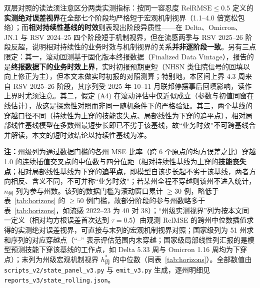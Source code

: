 \documentclass[11pt,a4paper]{article}
\theoremstyle{plain}
\theoremstyle{definition}
\begin{document}
双层对照的读法须注意区分两类实测指标：按同一容忍度 $\text{RelRMSE} \le 0.5$ 定义的\textbf{实测绝对误差视界}在全部七个阶段均严格短于宏观机制视界（1.1--4.0 倍宽松包络）；而\textbf{相对持续性基线的时效}则表现出阶段异质性——在 Delta、Omicron、JN.1 与 RSV 2024--25 四个阶段短于机制视界，但在流感两季与 RSV 2025--26 阶段反超，说明相对持续性的业务时效与机制视界的关系\textbf{并非逐阶段一致}。另有三点限定：其一，滚动回测基于固化版本终报数据（Finalized Data Vintage），报告的是\textbf{终报数据下的业务时效上界}，实时初报预期更短（NHSN 类住院信号的回填以向上修正为主），但本文未做实时初报的对照测算；特别地，本区间上界 4.3 周来自 RSV 2025--26 阶段，其序列受 2025 年 10--11 月联邦停摆事后回填影响，读作上界时尤须注意。其二，假定 (A4) 在滚动评估中仅近似成立（参数与初值同窗在线估计），故这是探索性对照而非同一随机条件下的严格验证。其三，两个基线的穿越口径不同（持续性为上穿的技能丧失点、局部线性为下穿的追平点），相对局部线性基线模型在多数州最短步长即已不劣于该基线，故“业务时效”不可跨基线合并解读，本文的短时效结论以持续性基线为准。

\begin{table}[htbp]
\centering
\footnotesize
\caption{宏观机制视界与伪实时滚动业务时效的州级双层对照}
\label{tab:rolling}
\resizebox{\textwidth}{!}{%
%
}
\vspace{2pt}
\begin{flushleft}
\scriptsize \textbf{注：}州级列为通过数据门槛的各州 MSE 比率（跨 6 个原点的均方误差之比）穿越 1.0 的连续插值交叉点的中位数与四分位距（相对持续性基线为上穿的\textbf{技能丧失点}；相对局部线性基线为下穿的\textbf{追平点}，即模型自该步长起不劣于该基线，两者方向相反、含义不同，不可并称“业务时效”；若某州全程不穿越则该州不进入统计，$n_{\text{州}}$ 列为参与州数。该列的数据门槛为滚动窗口累计 $\ge 30$ 例，略低于表~\ref{tab:horizons} 的 $\ge 50$ 例门槛，故部分阶段的参与州数略多于表~\ref{tab:horizons}，如流感 2022--23 为 40 对 38）；``州级实测视界''列为按本文同一定义（相对均方根误差首次达到 $\tau=0.5$）由观测 RelMSE 的跨州中位数插值求得的实测绝对误差视界，可直接与末列的宏观机制视界对照；国家级列为 51 州求和序列的对应穿越点（``--'' 表示评估范围内未穿越；国家级局部线性列汇报的是模型预测技能下穿该基线的工作点，如 Delta 5.33 周与 Omicron 1.16 周均为下穿点）；末列为州级宏观机制视界 $h^*_{\text{周}}$ 的中位数（同表~\ref{tab:horizons}）。全部数值由 \texttt{scripts\_v2/state\_panel\_v3.py} 与 \texttt{emit\_v3.py} 生成，逐州明细见 \texttt{reports\_v3/state\_rolling.json}。\end{flushleft}
\end{table}
\end{document}
